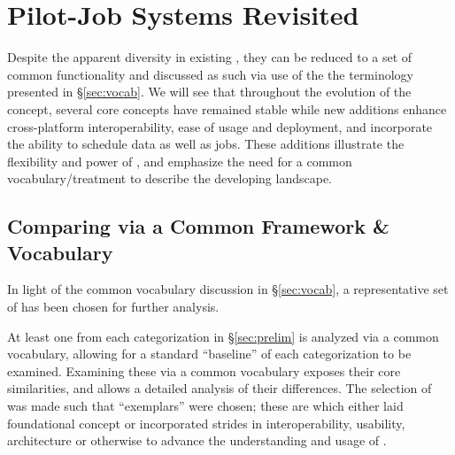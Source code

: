 \documentclass{sig-alternate}
\begin{document}
\section{Pilot-Job Systems Revisited}\label{sec:4}

Despite the apparent diversity in existing \pilotjobs,
they can be reduced to a set of common functionality and
discussed as such via use of the the terminology presented
in \S\ref{sec:vocab}.
We will see that throughout the evolution
of the \pilotjob concept, several core concepts have remained stable
while new additions enhance cross-platform interoperability,
ease of usage and deployment, and incorporate the ability to
schedule data as well as jobs.   These additions illustrate
the flexibility and power of \pilotjobs, and emphasize the
need for a common vocabulary/treatment to describe the
developing landscape.



\subsection{Comparing \pilotjobs via a Common Framework \& Vocabulary}
In light of the common vocabulary discussion in 
\S\ref{sec:vocab}, a representative set of \pilotjobs
has been chosen for further analysis.  

At least one \pilotjob from each categorization in \S\ref{sec:prelim}
is analyzed via a common vocabulary, allowing for a standard
``baseline'' of each \pilotjob categorization to be examined.
Examining these \pilotjobs via a common vocabulary exposes their core
similarities, and allows a detailed analysis of their differences.
The selection of \pilotjobs was made such that ``exemplars'' were
chosen; these are \pilotjobs which either laid foundational \pilotjob
concept or incorporated strides in interoperability, usability,
architecture or otherwise to advance the understanding and usage of
\pilotjobs.
\end{document}
